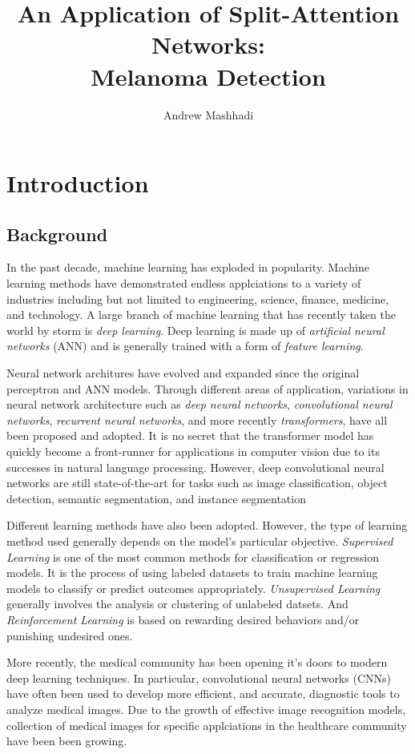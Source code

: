 \documentclass [MAS] {uclathes}
\title          {An Application of Split-Attention Networks:\\
                Melanoma Detection}
\author         {Andrew Mashhadi}
\begin{document}
\makeintropages


\chapter{Introduction}

\section{Background}

In the past decade, machine learning has exploded in popularity. Machine learning methods have demonstrated endless applciations to a variety of industries including but not limited to engineering, science, finance, medicine, and technology. A large branch of machine learning that has recently taken the world by storm is \textit{deep learning}. Deep learning is made up of \textit{artificial neural networks} (ANN) and is generally trained with a form of \textit{feature learning}. 

Neural network architures have evolved and expanded since the original perceptron and ANN models. Through different areas of application, variations in neural network architecture such as \textit{deep neural networks}, \textit{convolutional neural networks}, \textit{recurrent neural networks}, and more recently \textit{transformers}, have all been proposed and adopted. It is no secret that the transformer model has quickly become a front-runner for applications in computer vision due to its successes in natural language processing. However, deep convolutional neural networks are still state-of-the-art for tasks such as image classification, object detection, semantic segmentation, and instance segmentation

Different learning methods have also been adopted. However, the type of learning method used generally depends on the model's particular objective. \textit{Supervised Learning} is one of the most common methods for classification or regression models. It is the process of using labeled datasets to train machine learning models to classify or predict outcomes appropriately. \textit{Unsupervised Learning} generally involves the analysis or clustering of unlabeled datsets. And \textit{Reinforcement Learning} is based on rewarding desired behaviors and/or punishing undesired ones.

More recently, the medical community has been opening it's doors to modern deep learning techniques. In particular, convolutional neural networks (CNNs) have often been used to develop more efficient, and accurate, diagnostic tools to analyze medical images. Due to the growth of effective image recognition models, collection of medical images for specific applciations in the healthcare community have been been growing. 
\end{document}
